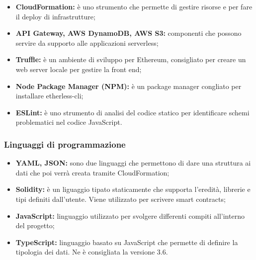 \begin{itemize}
    		 	\item \textbf{CloudFormation: }è uno strumento che permette di gestire risorse e per fare il deploy di infrastrutture;
    		 	\item \textbf{API Gateway, AWS DynamoDB, AWS S3: }componenti che possono servire da supporto alle applicazioni serverless;
    		 	\item \textbf{Truffle: }è un ambiente di sviluppo per Ethereum, consigliato per creare un web server locale per gestire la front end;
    		 	\item \textbf{Node Package Manager (NPM): }è un package manager congliato per installare etherless-cli;
    			\item \textbf{ESLint: }è uno strumento di analisi del codice statico per identificare schemi problematici nel codice JavaScript.
    		 
		\end{itemize}     	
	\subsubsection{Linguaggi di programmazione}
        	\begin{itemize}
        		\item \textbf{YAML, JSON: }sono due linguaggi che permettono di dare una struttura ai dati che poi verrà creata  tramite CloudFormation;
        		\item \textbf{Solidity: }è un liguaggio tipato staticamente che supporta l'eredità, librerie e tipi definiti dall'utente. Viene utilizzato per scrivere smart contracts;	
        		\item \textbf{JavaScript: } linguaggio utilizzato per svolgere differenti compiti all'interno del progetto;
        		\item \textbf{TypeScript: }linguaggio basato su JavaScript che  permette di definire la tipologia dei dati. Ne è consigliata la versione 3.6.
        \end{itemize}
      
